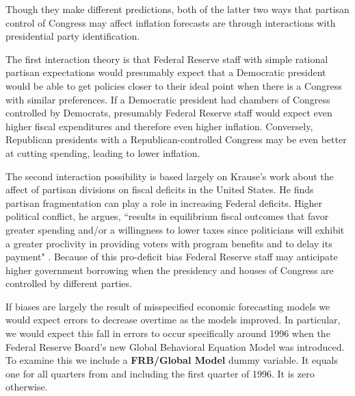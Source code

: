 \documentclass[a4paper]{article}\usepackage{graphicx, color}
\begin{document}
Though they make different predictions, both of the latter two ways that partisan control of Congress may affect inflation forecasts are through interactions with presidential party identification.

The first interaction theory is that Federal Reserve staff with simple rational partisan expectations would presumably expect that a Democratic president would be able to get policies closer to their ideal point when there is a Congress with similar preferences. If a Democratic president had chambers of Congress controlled by Democrats, presumably Federal Reserve staff would expect even higher fiscal expenditures and therefore even higher inflation. Conversely, Republican presidents with a Republican-controlled Congress may be even better at cutting spending, leading to lower inflation.

The second interaction possibility is based largely on Krause's \citeyearpar{Krause2000} work about the affect of partisan divisions on fiscal deficits in the United States. He finds partisan fragmentation can play a role in increasing Federal deficits. Higher political conflict, he argues, ``results in equilibrium fiscal outcomes that favor greater spending and/or a willingness to lower taxes since politicians will exhibit a greater proclivity in providing voters with program benefits and to delay its payment" \citep[][542]{Krause2000}. Because of this pro-deficit bias Federal Reserve staff may anticipate higher government borrowing when the presidency and houses of Congress are controlled by different parties. 

If biases are largely the result of misspecified economic forecasting models we would expect errors to decrease overtime as the models improved. In particular, we would expect this fall in errors to occur specifically around 1996 when the Federal Reserve Board's new Global Behavioral Equation Model was introduced. To examine this we include a {\bf{FRB/Global Model}} dummy variable. It equals one for all quarters from and including the first quarter of 1996. It is zero otherwise.
\end{document}
